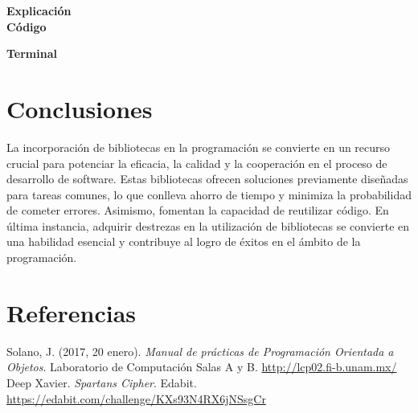 \documentclass[11pt, twocolumn]{article}
\begin{document}
  \textbf{Explicación} \\
  

  \textbf{Código}


  \textbf{Terminal}

  \section*{Conclusiones}
  La incorporación de bibliotecas en la programación se convierte en un recurso crucial para potenciar la eficacia, la calidad y la cooperación en el proceso de desarrollo de software. Estas bibliotecas ofrecen soluciones previamente diseñadas para tareas comunes, lo que conlleva ahorro de tiempo y minimiza la probabilidad de cometer errores. Asimismo, fomentan la capacidad de reutilizar código. En última instancia, adquirir destrezas en la utilización de bibliotecas se convierte en una habilidad esencial y contribuye al logro de éxitos en el ámbito de la programación.

  \section*{Referencias}
  \small
  Solano, J. (2017, 20 enero). \textit{Manual de prácticas de Programación Orientada a Objetos}. Laboratorio de Computación Salas A y B. \url{http://lcp02.fi-b.unam.mx/} \\

  Deep Xavier. \textit{Spartans Cipher}. Edabit. \url{https://edabit.com/challenge/KXs93N4RX6jNSsgCr}
\end{document}
